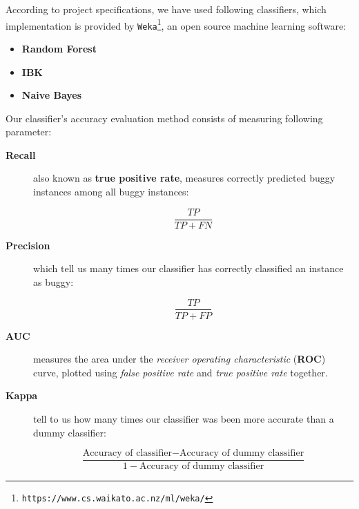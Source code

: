 \documentclass[sigconf]{acmart}
\begin{document}
According to project specifications, we have used following classifiers, which implementation is provided by \texttt{Weka}\footnote{\texttt{https://www.cs.waikato.ac.nz/ml/weka/}}, an open source machine learning software:
\begin{itemize}
\item \textbf{Random Forest}
\item \textbf{IBK}
\item \textbf{Naive Bayes}
\end{itemize}

Our classifier's accuracy evaluation method consists of measuring following parameter:

\begin{description}

\item[\textbf{Recall}] also known as \textbf{true positive rate}, measures correctly predicted buggy instances among all buggy instances:

\begin{equation}
\dfrac{TP}{TP + FN}
\end{equation}

\item[\textbf{Precision}] which tell us many times our classifier has correctly classified an instance as buggy:

\begin{equation}
\dfrac{TP}{TP + FP}
\end{equation}

\item[\textbf{AUC}] measures the area under the \textit{receiver operating characteristic} (\textbf{ROC}) curve, plotted using \textit{false positive rate} and \textit{true positive rate} together.

\item[\textbf{Kappa}] tell to us how many times our classifier was been more accurate than a dummy classifier:

\begin{equation}
\dfrac{\text{Accuracy of classifier} - \text{Accuracy of dummy classifier}}{1 - \text{Accuracy of dummy classifier}}
\end{equation}

\end{description}
\end{document}
